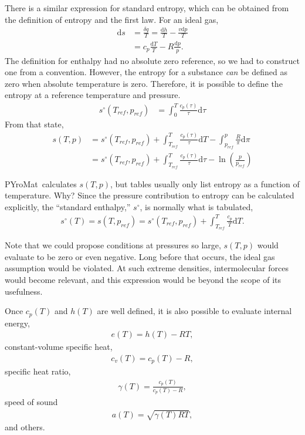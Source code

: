 \documentclass[letterpaper,11pt]{article}
\newcommand{\PM}{PYroMat}
\def\d{\mathrm{d}}
\begin{document}
There is a similar expression for standard entropy, which can be obtained from the definition of entropy and the first law.  For an ideal gas,
\begin{align}
\d s &= \frac{\delta q}{T} = \frac{\d h}{T} - \frac{v \d p}{T}\nonumber\\
 &= c_p \frac{\d T}{T} - R \frac{\d p}{p}.
\end{align}
The definition for enthalpy had no absolute zero reference, so we had to construct one from a convention.  However, the entropy for a substance \emph{can} be defined as zero when absolute temperature is zero.  Therefore, it is possible to define the entropy at a reference temperature and pressure.
\begin{align}
s^\circ(T_{ref},p_{ref}) &= \int_0^T \frac{c_p(\tau)}{\tau} \d \tau
\end{align}
From that state,
\begin{align}
s(T,p) &= s^\circ(T_{ref},p_{ref}) + \int_{T_{ref}}^T \frac{c_p(\tau)}{\tau} \d T - \int_{p_{ref}}^p \frac{R}{\pi} \d \pi\nonumber\\
&= s^\circ(T_{ref},p_{ref}) + \int_{T_{ref}}^T \frac{c_p(\tau)}{\tau} \d \tau - \ln\left(\frac{p}{p_{ref}}\right)\label{eqn:ig:entropy}
\end{align}

\PM\ calculates $s(T,p)$, but tables usually only list entropy as a function of temperature.  Why?  Since the pressure contribution to entropy can be calculated explicitly, the ``standard enthalpy,'' $s^\circ$, is normally what is tabulated,
\begin{align}
s^\circ(T) = s(T,p_{ref}) = s^\circ(T_{ref},p_{ref}) + \int_{T_{ref}}^T \frac{c_p}{T} \d T.
\end{align}

Note that we could propose conditions at pressures so large, $s(T,p)$ would evaluate to be zero or even negative.  Long before that occurs, the ideal gas assumption would be violated.  At such extreme densities, intermolecular forces would become relevant, and this expression would be beyond the scope of its usefulness.

Once $c_p(T)$ and $h(T)$ are well defined, it is also possible to evaluate internal energy,
\begin{align}
e(T) = h(T) - RT,
\end{align}
constant-volume specific heat,
\begin{align}
c_v(T) = c_p(T) - R,
\end{align}
specific heat ratio,
\begin{align}
\gamma(T) = \frac{c_p(T)}{c_p(T) - R},
\end{align}
speed of sound
\begin{align}
a(T) = \sqrt{\gamma(T) R T},
\end{align}
and others.
\end{document}
